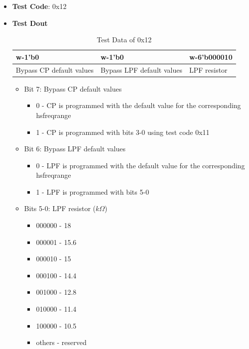 \documentclass[main\_\_EN.tex]{subfiles}
\begin{document}
\begin{itemize}
    \item \textbf{Test Code}: 0x12
    \item \textbf{Test Dout} 
        \begin{longtable}{ |p{4cm}|p{4cm}|p{4cm}|}
            \caption{Test Data of 0x12}
            \label{tab:test-data-0x12} \\
            \hline
            \rowcolor{lightgray}
            \textbf{w-1'b0} & \textbf{w-1'b0} & \textbf{w-6'b000010} \\ \hline
            Bypass CP default values & Bypass LPF default values & LPF resistor  \\ \hline
        \end{longtable}
        \begin{itemize}
            \item Bit 7: Bypass CP default values
                \begin{itemize}
                    \item 0 - CP is programmed with the default value for the corresponding hsfreqrange
                    \item 1 - CP is programmed with bits 3-0 using test code 0x11
                \end{itemize}
            \item Bit 6: Bypass LPF default values
                \begin{itemize}
                    \item 0 - LPF is programmed with the default value for the corresponding hsfreqrange
                    \item 1 - LPF is programmed with bits 5-0
                \end{itemize}
            \item Bits 5-0: LPF resistor ($k\Omega$)
                \begin{itemize}
                    \item 000000 - 18
                    \item 000001 - 15.6
                    \item 000010 - 15
                    \item 000100 - 14.4
                    \item 001000 - 12.8
                    \item 010000 - 11.4
                    \item 100000 - 10.5
                    \item others - reserved

\end{itemize}
\end{itemize}
\end{itemize}
\end{document}
